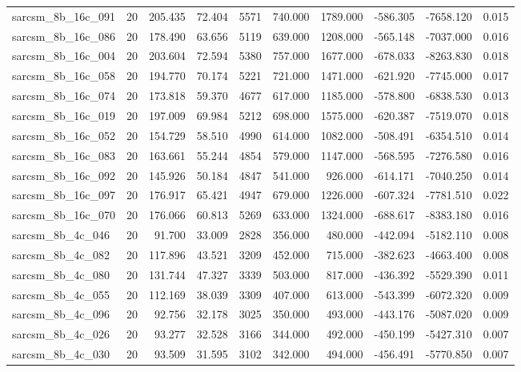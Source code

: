 \begin{tabular}{lrrrrrrrrr}
sarcsm\_8b\_16c\_091 & 20 & 205.435 & 72.404 & 5571 & 740.000 & 1789.000 & -586.305 & -7658.120 & 0.015 \\
sarcsm\_8b\_16c\_086 & 20 & 178.490 & 63.656 & 5119 & 639.000 & 1208.000 & -565.148 & -7037.000 & 0.016 \\
sarcsm\_8b\_16c\_004 & 20 & 203.604 & 72.594 & 5380 & 757.000 & 1677.000 & -678.033 & -8263.830 & 0.018 \\
sarcsm\_8b\_16c\_058 & 20 & 194.770 & 70.174 & 5221 & 721.000 & 1471.000 & -621.920 & -7745.000 & 0.017 \\
sarcsm\_8b\_16c\_074 & 20 & 173.818 & 59.370 & 4677 & 617.000 & 1185.000 & -578.800 & -6838.530 & 0.013 \\
sarcsm\_8b\_16c\_019 & 20 & 197.009 & 69.984 & 5212 & 698.000 & 1575.000 & -620.387 & -7519.070 & 0.018 \\
sarcsm\_8b\_16c\_052 & 20 & 154.729 & 58.510 & 4990 & 614.000 & 1082.000 & -508.491 & -6354.510 & 0.014 \\
sarcsm\_8b\_16c\_083 & 20 & 163.661 & 55.244 & 4854 & 579.000 & 1147.000 & -568.595 & -7276.580 & 0.016 \\
sarcsm\_8b\_16c\_092 & 20 & 145.926 & 50.184 & 4847 & 541.000 & 926.000 & -614.171 & -7040.250 & 0.014 \\
sarcsm\_8b\_16c\_097 & 20 & 176.917 & 65.421 & 4947 & 679.000 & 1226.000 & -607.324 & -7781.510 & 0.022 \\
sarcsm\_8b\_16c\_070 & 20 & 176.066 & 60.813 & 5269 & 633.000 & 1324.000 & -688.617 & -8383.180 & 0.016 \\
sarcsm\_8b\_4c\_046 & 20 & 91.700 & 33.009 & 2828 & 356.000 & 480.000 & -442.094 & -5182.110 & 0.008 \\
sarcsm\_8b\_4c\_082 & 20 & 117.896 & 43.521 & 3209 & 452.000 & 715.000 & -382.623 & -4663.400 & 0.008 \\
sarcsm\_8b\_4c\_080 & 20 & 131.744 & 47.327 & 3339 & 503.000 & 817.000 & -436.392 & -5529.390 & 0.011 \\
sarcsm\_8b\_4c\_055 & 20 & 112.169 & 38.039 & 3309 & 407.000 & 613.000 & -543.399 & -6072.320 & 0.009 \\
sarcsm\_8b\_4c\_096 & 20 & 92.756 & 32.178 & 3025 & 350.000 & 493.000 & -443.176 & -5087.020 & 0.009 \\
sarcsm\_8b\_4c\_026 & 20 & 93.277 & 32.528 & 3166 & 344.000 & 492.000 & -450.199 & -5427.310 & 0.007 \\
sarcsm\_8b\_4c\_030 & 20 & 93.509 & 31.595 & 3102 & 342.000 & 494.000 & -456.491 & -5770.850 & 0.007 \\

\end{tabular}
